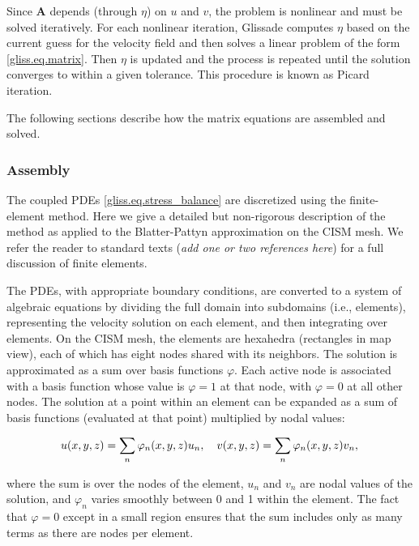 Since $\mathbf{A}$ depends (through $\eta$) on $u$ and $v$, the problem is nonlinear and must be solved iteratively.
For each nonlinear iteration, Glissade computes $\eta$ based on the
current guess for the velocity field and then solves a linear problem of the form \eqref{gliss.eq.matrix}.
Then $\eta$ is updated and the process is repeated until the solution converges to within a given tolerance.
This procedure is known as Picard iteration.

The following sections describe how the matrix equations are assembled and solved. 

\subsubsection{Assembly}

The coupled PDEs \eqref{gliss.eq.stress_balance} are discretized using the finite-element method.
Here we give a detailed but non-rigorous description of the method as applied to the Blatter-Pattyn
approximation on the CISM mesh.
We refer the reader to standard texts (\textit{add one or two references here}) 
for a full discussion of finite elements.

The PDEs, with appropriate boundary conditions, are converted to a system of algebraic equations
by dividing the full domain into subdomains (i.e., elements), representing the velocity solution on each element,
and then integrating over elements. On the CISM mesh, the elements are hexahedra (rectangles
in map view), each of which has eight nodes shared with its neighbors.
The solution is approximated as a sum over basis functions $\varphi$. 
Each active node is associated with a basis function whose value is $\varphi = 1$ at that node,
with $\varphi = 0$ at all other nodes. The solution at a point
within an element can be expanded as a sum of basis functions (evaluated at that point)
multiplied by nodal values:

\begin{equation}
\label{gliss.eq.velo_expansion}  
   u(x,y,z) = \sum\limits_{n}{{{\varphi }_{n}(x,y,z)}{{u}_{n}}}, \quad 
   v(x,y,z) = \sum\limits_{n}{{{\varphi }_{n}(x,y,z)}{{v}_{n}}},  \\
\end{equation}

\noindent
where the sum is over the nodes of the element, $u_n$ and $v_n$ are nodal
values of the solution, and $\varphi_n$ varies smoothly between 0 and 1 within the element.
The fact that $\varphi = 0$ except in a small region ensures that the sum includes only
as many terms as there are nodes per element.

